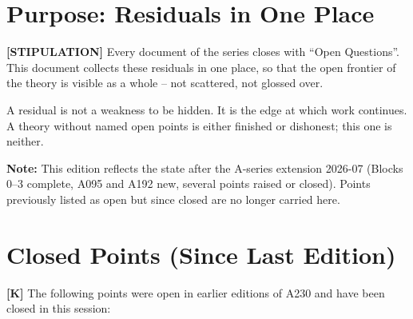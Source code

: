 \section{Purpose: Residuals in One Place}

\textbf{[STIPULATION]} Every document of the series closes with ``Open
Questions''. This document collects these residuals in one place, so that the
open frontier of the theory is visible as a whole -- not scattered, not glossed over.

A residual is not a weakness to be hidden. It is the edge at which work continues.
A theory without named open points is either finished or dishonest; this one is neither.

\textbf{Note:} This edition reflects the state after the A-series extension
2026-07 (Blocks 0--3 complete, A095 and A192 new, several points raised or
closed). Points previously listed as open but since closed are no longer carried here.

\section{Closed Points (Since Last Edition)}

\textbf{[K]} The following points were open in earlier editions of A230 and have
been closed in this session:

